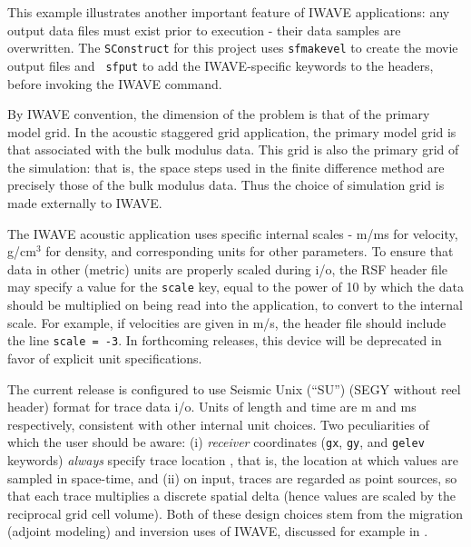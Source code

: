 This example illustrates another important feature of IWAVE
applications: any output data files must exist prior to execution -
their data samples are overwritten. The {\tt SConstruct} for this
project uses {\tt sfmakevel} to create the movie output files and {\tt
  sfput} to add the IWAVE-specific keywords to the headers, before
invoking the IWAVE command.

By IWAVE convention, the dimension of the problem is that of the primary
model grid. In the acoustic staggered grid application, the primary
model grid is that associated with the bulk modulus data. This grid is also the primary grid of the
simulation: that is, the space steps used in the finite difference
method are precisely those of the bulk modulus data.
Thus the choice of simulation grid is made externally to IWAVE.

The IWAVE acoustic application uses specific internal scales - m/ms
for velocity, g/cm$^3$ for density, and corresponding units for other
parameters. To ensure that data in other (metric) units are properly
scaled during i/o, the RSF header file may specify a value for the {\tt scale}
key, equal to the power of 10 by which the data should be multiplied
on being read into the application, to convert to the internal
scale. For example, if velocities are given in m/s, the header file
should include the line {\tt scale = -3}. In forthcoming releases,
this device will be deprecated in favor of explicit unit
specifications.

The current release is configured to use Seismic Unix (``SU'') (SEGY without reel header)
format for trace data i/o. Units of
length and time are m and ms respectively, consistent with other
internal unit choices. Two peculiarities of which the user should be
aware: (i) {\em receiver}
coordinates ({\tt gx}, {\tt gy}, and {\tt gelev} keywords) {\em always} specify trace location , that is, the
location at which values are sampled in space-time,
and (ii) on input, traces are regarded as point sources, so that each
trace multiplies a discrete spatial delta (hence values are scaled by the
reciprocal grid cell volume). Both of these design choices stem from the
migration (adjoint modeling) and inversion uses of IWAVE, discussed
for example in \cite[]{GeoPros:11,trip14:struct}. 

